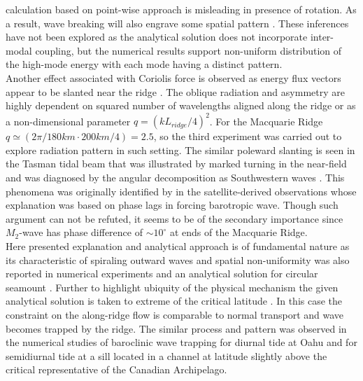 \documentclass[12pt]{article}
\begin{document}
calculation based on point-wise approach \citep[e.g.][]{st2003generation} is misleading in presence 
of rotation. As a result, wave breaking will also engrave some spatial pattern 
\citep{buhler2007instability}. These inferences have not been explored as the analytical solution 
does not incorporate inter-modal coupling, but the numerical results support non-uniform 
distribution of the high-mode energy with each mode having a distinct pattern.\\
Another effect associated with Coriolis force is observed as energy flux vectors appear to be 
slanted near the ridge . The oblique radiation and asymmetry are 
highly dependent on squared number of wavelengths aligned along the ridge or as a non-dimensional 
parameter $q = (k L_{ridge}/4)^2$. For the Macquarie Ridge $q \simeq (2\pi/180km \cdot 200km/4) = 
2.5$, so the third experiment was carried out to explore radiation pattern in such setting. The 
similar poleward slanting is seen in the Tasman tidal beam that was illustrated by marked turning 
in the near-field  and was diagnosed by the angular decomposition as 
Southwestern waves . This phenomena was originally identified by 
\citep{zhao2018satellite} in the satellite-derived observations whose explanation was based 
on phase lags in forcing barotropic wave. Though such argument can not be refuted, it seems to be 
of the secondary importance since $M_2$-wave has phase difference of $\sim 10^{\circ}$ 
 at ends of the Macquarie Ridge.\\
Here presented explanation and analytical approach is of fundamental nature as its characteristic 
of spiraling outward waves and spatial non-uniformity was also reported in numerical experiments 
\citep{munroe2005topographic} and an analytical solution for circular seamount 
\citep{baines2007internal}. Further to highlight ubiquity of the physical mechanism the given 
analytical solution is taken to extreme of the critical latitude . In this case the constraint on the along-ridge flow is comparable to normal transport and wave 
becomes trapped by the ridge. The similar process and pattern was observed in the numerical studies 
of 
baroclinic wave trapping for diurnal tide at Oahu \citep{smith2017coastal} and for semidiurnal tide 
at a sill located in a channel at latitude slightly above the critical \citep{hughes2018tidal} 
representative of the Canadian Archipelago.\\
\end{document}
